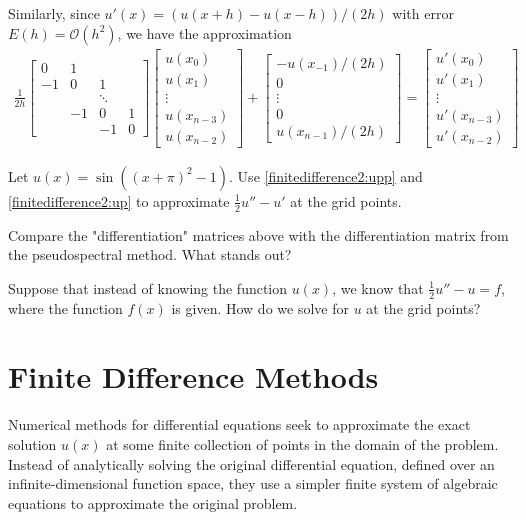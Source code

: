 Similarly, since  $u'(x) = (u(x+h) - u(x-h))/(2h)$ with error $E(h) = \mathcal{O}(h^2)$, we have the approximation
\begin{align}
\frac{1}{2h}
\begin{bmatrix}
0 & 1 & \\
-1 & 0 & 1  \\
& &\ddots & \\
 & -1 & 0 & 1 \\
 & & -1 & 0
\end{bmatrix}
\begin{bmatrix}
u(x_0) \\ u(x_1)\\ \vdots  \\ u(x_{n-3}) \\ u(x_{n-2})
\end{bmatrix} +
\begin{bmatrix}
-u(x_{-1})/(2h) \\ 0 \\ \vdots  \\ 0 \\ u(x_{n-1})/(2h)
\end{bmatrix} =
\begin{bmatrix}
u'(x_0) \\ u'(x_1)\\ \vdots  \\ u'(x_{n-3}) \\ u'(x_{n-2})
\end{bmatrix}\label{finitedifference2:up}
\end{align}

\begin{problem}
	Let $u(x) = \sin((x+\pi)^2-1)$. Use \eqref{finitedifference2:upp} and \eqref{finitedifference2:up} to approximate $\frac{1}{2}u'' - u'$ at the grid points.
	
	Compare the "differentiation" matrices above with the differentiation matrix from the pseudospectral method. What stands out? 
\label{prob:finitedifference2:prob1}
\end{problem}

Suppose that instead of knowing the function $u(x)$, we know that $\frac{1}{2}u'' - u = f$, where the function $f(x)$ is given.
How do we solve for $u$ at the grid points?

\section*{Finite Difference Methods}

Numerical methods for differential equations seek to approximate the exact solution $u(x)$ at some finite collection of points in the domain of the problem.
Instead of analytically solving the original differential equation, defined over an infinite-dimensional function space, they use a simpler finite system of algebraic equations to approximate the original problem.
 

